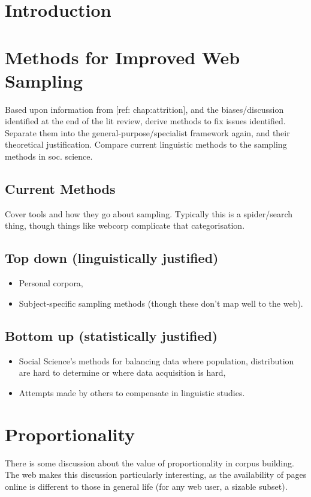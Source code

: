 
\section{Introduction}





\section{Methods for Improved Web Sampling}
Based upon information from [ref: chap:attrition], and the biases/discussion identified at the end of the lit review, derive methods to fix issues identified.  Separate them into the general-purpose/specialist framework again, and their theoretical justification.  Compare current linguistic methods to the sampling methods in soc. science.

\subsection{Current Methods}
Cover tools and how they go about sampling.  Typically this is a spider/search thing, though things like webcorp complicate that categorisation.


\subsection{Top down (linguistically justified)}
\begin{itemize}
    \item Personal corpora,
    \item Subject-specific sampling methods (though these don't map well to the web).
\end{itemize}
\subsection{Bottom up (statistically justified)}
\begin{itemize}
	\item Social Science's methods for balancing data where population, distribution are hard to determine or where data acquisition is hard,
	\item Attempts made by others to compensate in linguistic studies.
\end{itemize}





\section{Proportionality}
There is some discussion about the value of proportionality in corpus building.  The web makes this discussion particularly interesting, as the availability of pages online is different to those in general life (for any web user, a sizable subset).

